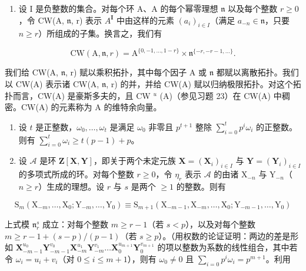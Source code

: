 \begin{enumerate}
\def\labelenumi{\arabic{enumi})}
\setcounter{enumi}{23}
\tightlist
\item
  设 I 是负整数的集合。对每个环 A、A 的每个幂零理想 \(\mathfrak{n}\) 以及每个整数 \(r \geqslant 0\)，令 CW(A, \(\mathfrak{n}\), r) 表示 \(A^{\mathbf{I}}\) 中由这样的元素 \((a_{i})_{i \in I}\)（满足 \(a_{-n} \in \mathfrak{n}\)，只要 \(n \geqslant r\)）所组成的子集。换言之，我们有
\end{enumerate}

\[
\mathrm{CW} (\mathrm{A}, \mathfrak {n}, r) = \mathrm{A} ^ {\{0, - 1, \dots , 1 - r \}} \times \mathfrak {n} ^ {\{- r, - r - 1, \dots \}}.
\]

我们给 CW(A, \(\mathfrak{n}\), r) 赋以乘积拓扑，其中每个因子 A 或 \(\mathfrak{n}\) 都赋以离散拓扑。我们以 CW(A) 表示诸 CW(A, \(\mathfrak{n}\), r) 的并，并给 CW(A) 赋以归纳极限拓扑。对这个拓扑而言，CW(A) 是豪斯多夫的，且 CW \(^{u}\) (A)（参见习题 23）在 CW(A) 中稠密。CW(A) 的元素称为 A 的维特余向量。

\begin{enumerate}
\def\labelenumi{\alph{enumi})}
\item
  设 \(t\) 是正整数，\(\omega_0, \ldots, \omega_t\) 是满足 \(\omega_0\) 非零且 \(p^{t+1}\) 整除 \(\sum_{i=0}^{t} p^i \omega_i\) 的正整数。则有 \(\sum_{i=0}^{t} \omega_i \geqslant t(p-1) + p\)。
\item
  设 \(\mathcal{A}\) 是环 \(\mathbf{Z}[\mathbf{X},\mathbf{Y}]\)，即关于两个未定元族 \(\mathbf{X} = (\mathbf{X}_i)_{i\in I}\) 与 \(\mathbf{Y} = (\mathbf{Y}_i)_{i\in I}\) 的多项式所成的环。对每个整数 \(r\geqslant 0\)，令 \(\eta_r\) 表示 \(\mathcal{A}\) 的由诸 \(\mathrm{X}_{-n}\) 与 \(\mathrm{Y}_{-n}\)（\(n\geqslant r\)）生成的理想。设 \(r\) 与 \(s\) 是两个 \(\geqslant 1\) 的整数。则有
\end{enumerate}

\[
\mathrm{S} _ {m} \left(\mathrm{X} _ {- m}, \dots , \mathrm{X} _ {0}; \mathrm{Y} _ {- m}, \dots , \mathrm{Y} _ {0}\right) \equiv \mathrm{S} _ {m + 1} \left(\mathrm{X} _ {- m - 1}, \mathrm{X} _ {- m}, \dots , \mathrm{X} _ {0}; \mathrm{Y} _ {- m - 1}, \dots , \mathrm{Y} _ {0}\right)
\]

上式模 \(\mathfrak{n}_r^s\) 成立：对每个整数 \(m \geqslant r - 1\)（若 \(s < p\)），以及对每个整数 \(m \geqslant r - 1 + (s - p) / (p - 1)\)（若 \(s \geqslant p\)）。（用权数的论证证明：两边的差是形如 \(\mathbf{X}_{-m-1}^{u_0}\mathbf{Y}_{-m-1}^{v_0}\mathbf{X}_{-m}^{u_1}\mathbf{Y}_{-m}^{v_1}\ldots\mathbf{X}_0^{u_{m+1}}\mathbf{Y}_0^{v_{m+1}}\) 的项以整数为系数的线性组合，其中若令 \(\omega_i = u_i + v_i\)（对 \(0 \leqslant i \leqslant m + 1\)），则有 \(\omega_0 \neq 0\) 且 \(\sum_{i=0} p^i \omega_i = p^{m+1}\)。利用

